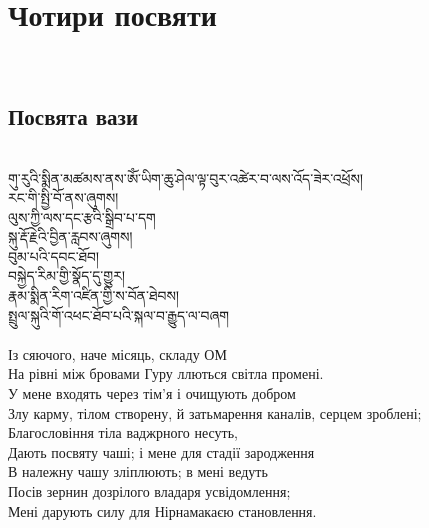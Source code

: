 \section{Чотири посвяти}
\\
\subsection{Посвята вази}
\\
\ti
གུ་རུའི་སྨིན་མཚམས་ནས་ཨོཾ་ཡིག་ཆུ་ཤེལ་ལྟ་བུར་འཚེར་བ་ལས་འོད་ཟེར་འཕྲོས།\\
རང་གི་སྤྱི་བོ་ནས་ཞུགས།\\
ལུས་ཀྱི་ལས་དང་རྩའི་སྒྲིབ་པ་དག\\
སྐུ་རྡོ་རྗེའི་བྱིན་རླབས་ཞུགས།\\
བུམ་པའི་དབང་ཐོབ།\\
བསྐྱེད་རིམ་གྱི་སྣོད་དུ་གྱུར།\\
རྣམ་སྨིན་རིག་འཛིན་གྱི་ས་བོན་ཐེབས།\\
སྤྲུལ་སྐུའི་གོ་འཕང་ཐོབ་པའི་སྐལ་བ་རྒྱུད་ལ་བཞག\\
\\
\ru
Із сяючого, наче місяць, складу ОМ\\
На рівні між бровами Гуру ллються світла промені.\\
У мене входять через тім'я і очищують добром\\
Злу карму, тілом створену, й затьмарення каналів, серцем зроблені;\\
Благословіння тіла ваджрного несуть,\\
Дають посвяту чаші; і мене для стадії зародження\\
В належну чашу зліплюють; в мені ведуть\\
Посів зернин дозрілого владаря усвідомлення;\\
Мені дарують силу для Нірнамакаєю становлення.\\

\newpage
